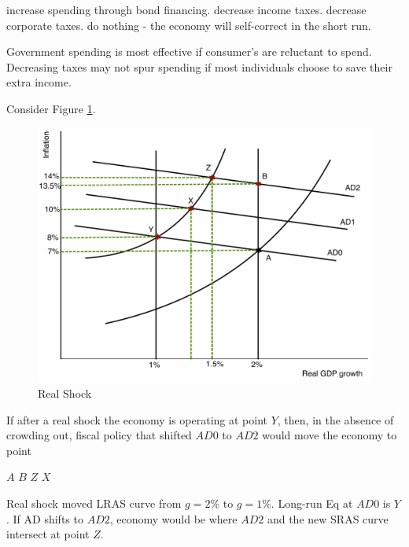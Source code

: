 \documentclass[addpoints,11pt]{exam}
\theoremstyle{definition}
\begin{document}
\begin{questions}
\begin{choices}
	\CorrectChoice increase spending through bond financing.
	\choice decrease income taxes.
	\choice decrease corporate taxes.
	\choice do nothing - the economy will self-correct in the short run.
\end{choices}

\begin{solution}
	Government spending is most effective if consumer's are reluctant to spend. Decreasing taxes may not spur spending if most individuals choose to save their extra income.
\end{solution}

\newpage

\question Consider Figure \ref{fig1}.


\begin{figure}[H]
	\centering
	\includegraphics[scale=.45]{ec2_plot1.pdf}
	\caption{Real Shock}
	\label{fig1}
\end{figure}

If after a real shock the economy is operating at point $Y$, then, in the absence of crowding out, fiscal policy that shifted $AD0$ to $AD2$ would move the economy to point

\begin{choices}
	\choice $A$
	\choice $B$
	\CorrectChoice $Z$
	\choice $X$
\end{choices}

\begin{solution}
	Real shock moved LRAS curve from $g=2\%$ to $g=1\%$. Long-run Eq at $AD0$ is $Y$. If AD shifts to $AD2$, economy would be where $AD2$ and the new SRAS curve intersect at point $Z$.
\end{solution}


\end{questions}
\end{document}
